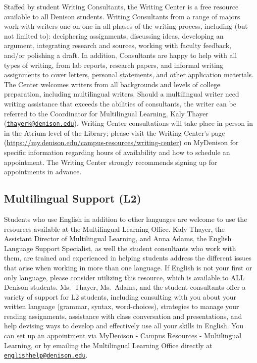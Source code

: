 \documentclass[11pt,]{article}
\begin{document}
Staffed by student Writing Consultants, the Writing Center is a free
resource available to all Denison students. Writing Consultants from a
range of majors work with writers one-on-one in all phases of the
writing process, including (but not limited to): deciphering
assignments, discussing ideas, developing an argument, integrating
research and sources, working with faculty feedback, and/or polishing a
draft. In addition, Consultants are happy to help with all types of
writing, from lab reports, research papers, and informal writing
assignments to cover letters, personal statements, and other application
materials. The Center welcomes writers from all backgrounds and levels
of college preparation, including multilingual writers. Should a
multilingual writer need writing assistance that exceeds the abilities
of consultants, the writer can be referred to the Coordinator for
Multilingual Learning, Kaly Thayer
(\href{mailto:thayerk@denison.edu}{\nolinkurl{thayerk@denison.edu}}).
Writing Center consultations will take place in person in in the Atrium
level of the Library; please visit the Writing Center's page
(\url{https://my.denison.edu/campus-resources/writing-center}) on
MyDenison for specific information regarding hours of availability and
how to schedule an appointment. The Writing Center strongly recommends
signing up for appointments in advance.

\hypertarget{multilingual-support-l2}{%
\subsection{Multilingual Support (L2)}\label{multilingual-support-l2}}

Students who use English in addition to other languages are welcome to
use the resources available at the Multilingual Learning Office. Kaly
Thayer, the Assistant Director of Multilingual Learning, and Anna Adams,
the English Language Support Specialist, as well the student consultants
who work with them, are trained and experienced in helping students
address the different issues that arise when working in more than one
language. If English is not your first or only language, please consider
utilizing this resource, which is available to ALL Denison students.
Ms.~Thayer, Ms.~Adams, and the student consultants offer a variety of
support for L2 students, including consulting with you about your
written language (grammar, syntax, word-choices), strategies to manage
your reading assignments, assistance with class conversation and
presentations, and help devising ways to develop and effectively use all
your skills in English. You can set up an appointment via MyDenison -
Campus Resources - Multilingual Learning, or by emailing the
Multilingual Learning Office directly at
\href{mailto:englishhelp@denison.edu}{\nolinkurl{englishhelp@denison.edu}}.
\end{document}
